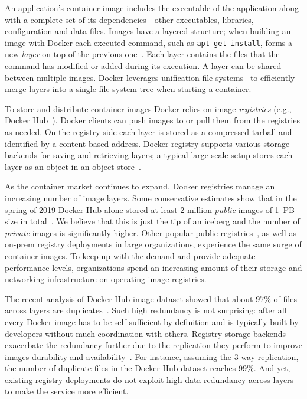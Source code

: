 An application's container image includes the executable of the application
along with a complete set of its dependencies---other executables, libraries,
configuration and data files.
%
Images have a layered structure; when building an image with Docker each
executed command, such as \texttt{apt-get install}, forms a new \emph{layer} on
top of the previous one~\cite{dockerfile}.
%
Each layer contains the files that the command has modified or added during its
execution.
%
A layer can be shared between multiple images.
%
Docker leverages unification file systems~\cite{docker-driver-eval} to
efficiently merge layers into a single file system tree when starting a container.

To store and distribute container images Docker relies on image
\emph{registries} (e.g., Docker Hub~\cite{docker-hub}).
%
Docker clients can push images to or pull them from the registries as needed.
%
On the registry side each layer is stored as a compressed tarball and
identified by a content-based address.
%
Docker registry supports various storage backends for saving and retrieving
layers; a typical large-scale setup stores each layer as an object in an object
store~\cite{s3,swift}.

As the container market continues to expand, Docker registries manage an
increasing number of image layers.
%
Some conservative estimates show that in the spring of 2019 Docker Hub alone
stored at least 2 million \emph{public} images of 1~PB size in
total~\cite{skourtis2019carving,dedupanalysis}. 
%
We believe that this is just the tip of an iceberg and the number of
\emph{private} images is significantly higher.
%
Other popular public
registries~\cite{amazon-ecr,jfrog-artifactory,azure-cr,google-cr}, as well as
on-prem registry deployments in large organizations, experience the same
surge of container images.
%
To keep up with the demand and provide adequate performance levels,
organizations spend an increasing amount of their storage and networking
infrastructure on operating image registries.
%
%

The recent analysis of
Docker Hub image dataset showed that about $97$\% of files across layers are
duplicates~\cite{dedupanalysis}.
%
Such high redundancy is not surprising: after all every Docker image has to be
self-sufficient by definition and is typically built by developers without much
coordination with others.
%
Registry storage backends exacerbate the redundancy further due to the
replication they perform to improve images durability and
availability~\cite{Bonvin:2010:SFS:1807128.1807162}.
%
For instance, assuming the 3-way replication, the number of duplicate files in the
Docker Hub dataset reaches 99\%.
%
And yet, existing registry deployments do not exploit high data redundancy
across layers to make the service more efficient.

